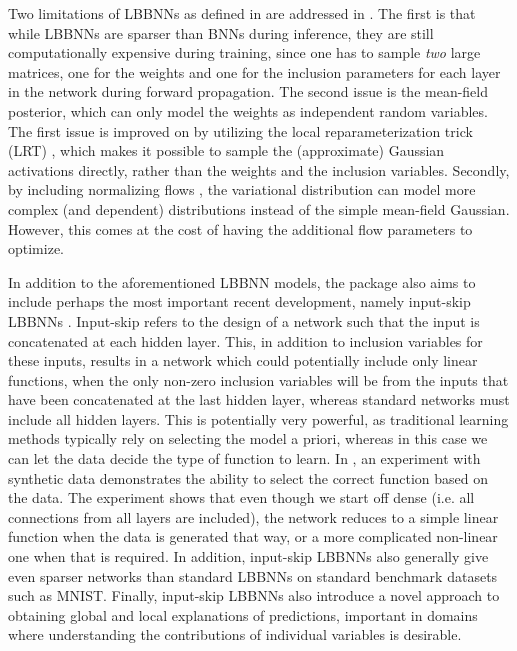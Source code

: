 Two limitations of LBBNNs as defined in \cite{hubin2024sparse} are addressed in \cite{skaaret-lund2024sparsifying}. The first is that while LBBNNs are sparser than BNNs during inference, they are still computationally expensive during training, since one has to sample \emph{two} large matrices, one for the weights and one for the inclusion parameters for each layer in the network during forward propagation. The second issue is the mean-field posterior, which can only model the weights as independent random variables. The first issue is improved on by utilizing the local reparameterization trick (LRT) \citep{kingma2015variational}, which makes it possible to sample the (approximate) Gaussian activations directly, rather than the weights and the inclusion variables. Secondly, by including normalizing flows \citep{rezende2015variational}, the variational distribution can model more complex (and dependent) distributions instead of the simple mean-field Gaussian. However, this comes at the cost of having the additional flow parameters to optimize. 

In addition to the aforementioned LBBNN models, the package also aims to include perhaps the most important recent development, namely input-skip LBBNNs \citep{hoyheim2026explainable}. Input-skip refers to the design of a network such that the input is concatenated at each hidden layer. This, in addition to inclusion variables for these inputs, results in a network which could potentially include only linear functions, when the only non-zero inclusion variables will be from the inputs that have been concatenated at the last hidden layer, whereas standard networks must include all hidden layers. This is potentially very powerful, as traditional learning methods typically rely on selecting the model a priori, whereas in this case we can let the data decide the type of function to learn. In \cite{hoyheim2026explainable}, an experiment with synthetic data demonstrates the ability to select the correct function based on the data. The experiment shows that even though we start off dense (i.e. all connections from all layers are included), the network reduces to a simple linear function when the data is generated that way, or a more complicated non-linear one when that is required. In addition, input-skip LBBNNs also generally give even sparser networks than standard LBBNNs on standard benchmark datasets such as MNIST. Finally, input-skip LBBNNs also introduce a novel approach to obtaining global and local explanations of predictions, important in domains where understanding the contributions of individual variables is desirable. 

